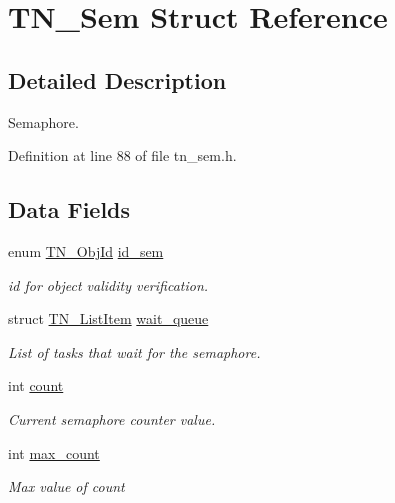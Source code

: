 \hypertarget{structTN__Sem}{\section{T\+N\+\_\+\+Sem Struct Reference}
\label{structTN__Sem}
}


\subsection{Detailed Description}
Semaphore. 

Definition at line 88 of file tn\+\_\+sem.\+h.

\subsection*{Data Fields}
\begin{DoxyCompactItemize}
\item 
enum \hyperlink{tn__common_8h_ae779dd1f6735f6e139fb70acd004d976}{T\+N\+\_\+\+Obj\+Id} \hyperlink{structTN__Sem_a810526e9b3d5595278ebb70e59a128e1}{id\+\_\+sem}
\begin{DoxyCompactList}\small\item\em id for object validity verification. \end{DoxyCompactList}\item 
\hypertarget{structTN__Sem_ac6cf5b47221528a5ce024c60b92be280}{struct \hyperlink{structTN__ListItem}{T\+N\+\_\+\+List\+Item} \hyperlink{structTN__Sem_ac6cf5b47221528a5ce024c60b92be280}{wait\+\_\+queue}}\label{structTN__Sem_ac6cf5b47221528a5ce024c60b92be280}

\begin{DoxyCompactList}\small\item\em List of tasks that wait for the semaphore. \end{DoxyCompactList}\item 
\hypertarget{structTN__Sem_a5a2358e2425da2930ef8e105a642822b}{int \hyperlink{structTN__Sem_a5a2358e2425da2930ef8e105a642822b}{count}}\label{structTN__Sem_a5a2358e2425da2930ef8e105a642822b}

\begin{DoxyCompactList}\small\item\em Current semaphore counter value. \end{DoxyCompactList}\item 
\hypertarget{structTN__Sem_abd62d79c3aace05abd7252f2058b1e5b}{int \hyperlink{structTN__Sem_abd62d79c3aace05abd7252f2058b1e5b}{max\+\_\+count}}\label{structTN__Sem_abd62d79c3aace05abd7252f2058b1e5b}

\begin{DoxyCompactList}\small\item\em Max value of {\ttfamily count} \end{DoxyCompactList}\end{DoxyCompactItemize}


